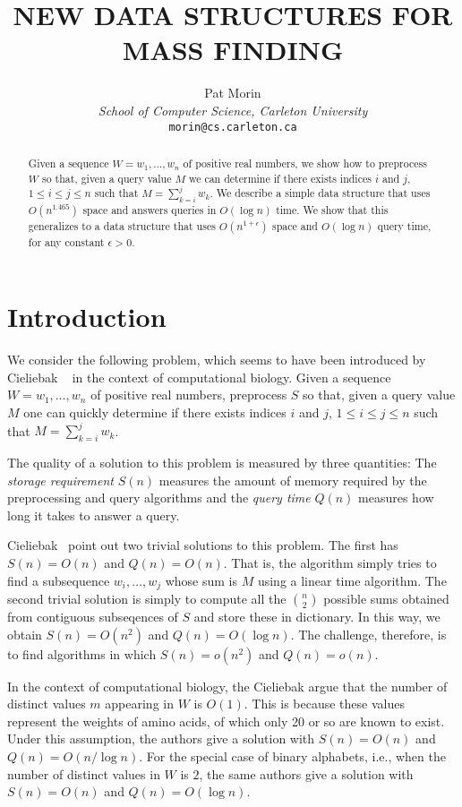 \documentclass[ccfonts,lotsofwhite]{patmorin}
\title{\MakeUppercase{New Data Structures for Mass Finding}}
\author{Pat Morin \\
	\emph{School of Computer Science, Carleton University} \\
	\texttt{morin@cs.carleton.ca}}
\date{}
\begin{document}
\maketitle
\begin{abstract}
Given a sequence $W=w_1,\ldots,w_n$ of positive real numbers, we show
how to preprocess $W$ so that, given a query value $M$ we can
determine if there exists indices $i$ and $j$, $1\le i\le j\le n$ such
that $M=\sum_{k=i}^j w_k$.  We describe a simple data structure that
uses $O(n^{1.465})$ space and answers queries in $O(\log n)$ time.  We
show that this generalizes to a data structure that uses
$O(n^{1+\epsilon})$ space and $O(\log n)$ query time, for any constant
$\epsilon > 0$.  
\end{abstract}

\section{Introduction}

We consider the following problem, which seems to have been introduced
by Cieliebak \etal\ \cite{cels02,cels01b} in the context of
computational biology.  Given a sequence $W=w_1,\ldots,w_n$ of
positive real numbers, preprocess $S$ so that, given a query value $M$
one can quickly determine if there exists indices $i$ and $j$, $1\le
i\le j\le n$ such that $M=\sum_{k=i}^j w_k$.

The quality of a solution to this problem is measured by three
quantities: The \emph{storage requirement} $S(n)$ measures the amount
of memory required by the preprocessing and query algorithms and the
\emph{query time} $Q(n)$ measures how long it takes to answer a query.

Cieliebak \etal\ point out two trivial solutions to this problem.  The
first has $S(n)=O(n)$ and $Q(n)=O(n)$. That is, the algorithm simply
tries to find a subsequence $w_i,\ldots,w_j$ whose sum is $M$ using a
linear time algorithm.  The second trivial solution is simply to
compute all the $n\choose 2$ possible sums obtained from contiguous
subseqences of $S$ and store these in dictionary.  In this way, we
obtain $S(n)=O(n^2)$ and $Q(n)=O(\log n)$.  The challenge, therefore,
is to find algorithms in which $S(n)=o(n^2)$ and $Q(n)=o(n)$.

In the context of computational biology, the Cieliebak argue that the
number of distinct values $m$ appearing in $W$ is $O(1)$.  This is
because these values represent the weights of amino acids, of which
only 20 or so are known to exist.  Under this assumption, the authors
give a solution with $S(n)=O(n)$ and $Q(n)=O(n/\log n)$.  For the
special case of binary alphabets, i.e., when the number of distinct
values in $W$ is $2$, the same authors give a solution with
$S(n)=O(n)$ and $Q(n)=O(\log n)$.
\end{document}
